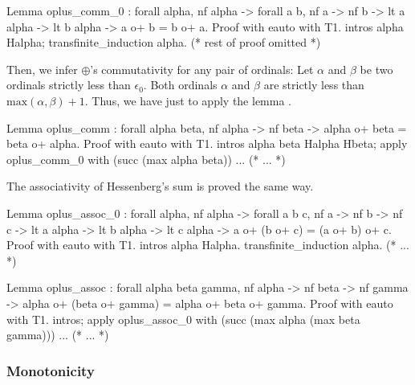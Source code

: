 
    \begin{Coqsrc}
    Lemma oplus_comm_0 : forall alpha, nf alpha ->
         forall a b,  nf a -> nf b ->
                      lt a alpha ->
                      lt b alpha ->
                      a o+ b = b o+ a.
     Proof with eauto with T1.
        intros alpha Halpha; transfinite_induction alpha.
    (* rest of proof omitted *)  
    \end{Coqsrc}

    Then, we infer  $\oplus$'s commutativity for any pair of ordinals:
    Let $\alpha$ and $\beta$ be two ordinals strictly less than $\epsilon_0$. Both ordinals $\alpha$ and $\beta$ are
    strictly less than $\textrm{max}(\alpha,\beta)+1$.
        Thus, we have just to apply the lemma .

    \begin{Coqsrc}
      Lemma oplus_comm : forall alpha beta, 
          nf alpha -> nf beta ->
          alpha o+ beta =  beta o+ alpha.
      Proof with eauto with T1.
        intros alpha beta Halpha Hbeta;
        apply oplus_comm_0 with (succ (max alpha beta)) ...  
      (* ... *)
    \end{Coqsrc}

    The associativity of Hessenberg's sum is proved the same way.


    \begin{Coqsrc}
     Lemma oplus_assoc_0 :
        forall alpha,
          nf alpha ->
          forall a b c,  nf a -> nf b -> nf c ->
                          lt a alpha ->
                          lt b alpha -> lt c alpha ->
                          a o+ (b o+ c) = (a o+ b) o+ c.
      Proof with eauto with T1.
        intros alpha Halpha.
        transfinite_induction alpha.
        (* ... *)
    \end{Coqsrc}


    \begin{Coqsrc}
     Lemma oplus_assoc : forall alpha beta gamma,
                            nf alpha -> nf beta -> nf gamma ->
                                        alpha o+ (beta o+ gamma) =
                                        alpha o+ beta o+ gamma.
     Proof with eauto with T1.
        intros;
        apply oplus_assoc_0 with (succ (max alpha (max beta gamma))) ...
        (* ... *)   
    \end{Coqsrc}


    \subsubsection{Monotonicity}

